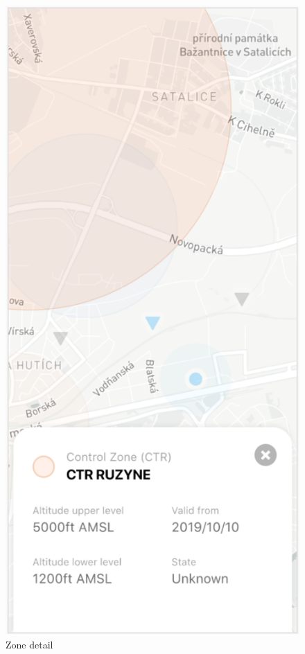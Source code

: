 \begin{figure}
    \centering
    \begin{minipage}{.4\textwidth}
        \centering
        \includegraphics[width=.7\linewidth]{assets/user_interface_design/dashboard/dashboard_zone_detail.png}
        \caption{Zone detail}
        \label{fig:dashboard_zone_detail}
    \end{minipage}%
    \hspace{.05\linewidth}
    \begin{minipage}{.4\textwidth}
        \centering

\end{minipage}
\end{figure}
